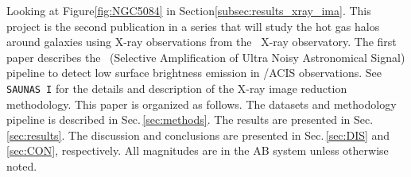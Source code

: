 \documentclass[modern]{CORE-AAS/aastex631}
\begin{document}
Looking at Figure\ref{fig:NGC5084} in Section\ref{subsec:results_xray_ima}.
This project is the second publication in a series that will study the hot gas halos around galaxies using X-ray observations from the \Chandra\ X-ray observatory. The first paper \citep[first thing][\texttt{SAUNAS I}, hereafter]{borlaff+2024apj967_169} describes the \SAUNAS\ (Selective Amplification of Ultra Noisy Astronomical Signal) pipeline to detect low surface brightness emission in \Chandra/ACIS observations. See \texttt{SAUNAS I} for the details and description of the X-ray image reduction methodology.
This paper is organized as follows. The datasets and methodology pipeline is described in Sec.\,\ref{sec:methods}. The results are presented in Sec.\,\ref{sec:results}. The discussion and conclusions are presented in Sec.\,\ref{sec:DIS} and \ref{sec:CON}, respectively. All magnitudes are in the AB system \citep{oke1971apj170_193} unless otherwise noted.
\end{document}
